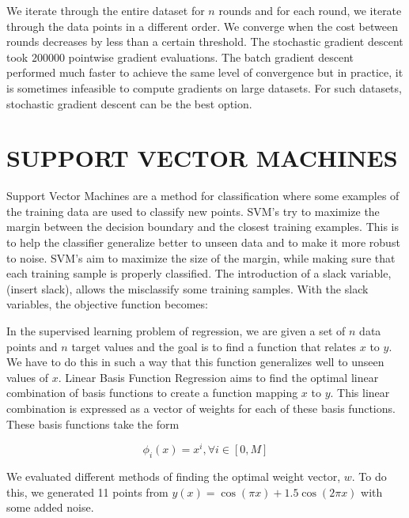 \documentclass[a4paper,twoside]{article}
\begin{document}
 We iterate through the entire dataset for $n$ rounds and for each round, we iterate through the data points in a different order. We converge when the cost between rounds decreases by less than a certain threshold. The stochastic gradient descent took $200000$ pointwise gradient evaluations. The batch gradient descent performed much faster to achieve the same level of convergence but in practice, it is sometimes infeasible to compute gradients on large datasets. For such datasets, stochastic gradient descent can be the best option.



\section{\uppercase{Support Vector Machines}}

Support Vector Machines are a method for classification where some examples of the training data are used to classify new points. SVM's try to maximize the margin between the decision boundary and the closest training examples. This is to help the classifier generalize better to unseen data and to make it more robust to noise. SVM's aim to maximize the size of the margin, while making sure that each training sample is properly classified. The introduction of a slack variable, (insert slack), allows the misclassify some training samples. With the slack variables, the objective function becomes:

In the supervised learning problem of regression, we are given a set of $n$ data points and $n$ target values and the goal is to find a function that relates $x$ to $y$. We have to do this in such a way that this function generalizes well to unseen values of $x$. Linear Basis Function Regression aims to find the optimal linear combination of basis functions to create a function mapping $x$ to $y$. This linear combination is expressed as a vector of weights for each of these basis functions. These basis functions take the form

\begin{equation}
\phi_i(x) = x^i,  \forall i \in [0,M]
\end{equation}

We evaluated different methods of finding the optimal weight vector, $w$. To do this, we generated 11 points from $y(x) = \cos(\pi x)+1.5 \cos(2 \pi x)$ with some added noise. 
\end{document}
